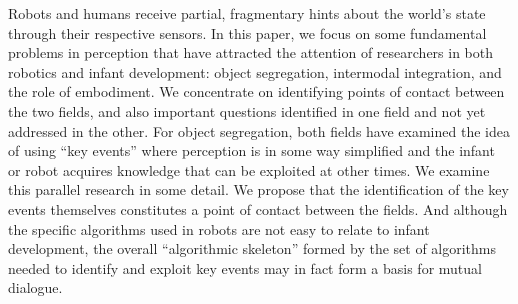 
Robots and humans receive partial, fragmentary hints about the world's
state through their respective sensors.  In this paper, we focus on
some fundamental problems in perception that have attracted the
attention of researchers in both robotics and infant development:
object segregation, intermodal integration, and the role of
embodiment.  
%
%
We concentrate on identifying points of contact
between the two fields, and also important questions identified in one
field and not yet addressed in the other.
%
For object segregation, both fields have 
examined the idea of 
using ``key events'' where perception is in some way simplified
and the infant or robot  acquires
knowledge that can be exploited at other times.
%
We examine this parallel research in some detail. We propose that
the identification
of the key events themselves constitutes a point of contact between
the fields.  And although the specific algorithms used in robots are
not easy to relate to infant development, the overall ``algorithmic
skeleton'' formed by the set of algorithms needed to identify and
exploit key events may in fact form a basis for mutual dialogue.

%
%




